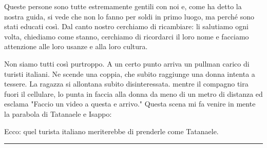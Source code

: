 Queste persone sono tutte estremamente gentili con noi e, come ha detto la nostra guida, si vede che non lo fanno per soldi in primo luogo, ma perché sono stati educati così. Dal canto nostro cerchiamo di ricambiare: li salutiamo ogni volta, chiediamo come stanno, cerchiamo di ricordarci il loro nome e facciamo attenzione alle loro usanze e alla loro cultura.

Non siamo tutti così purtroppo. A un certo punto arriva un pullman carico di turisti italiani. Ne scende una coppia, che subito raggiunge una donna intenta a tessere. La ragazza si allontana subito disinteressata. mentre il compagno tira fuori il cellulare, lo punta in faccia alla donna da meno di un metro di distanza ed esclama "Faccio un video a questa e arrivo." Questa scena mi fa venire in mente la parabola di Tatanaele e Isappo:

\FloatBarrier
{}
\FloatBarrier















Ecco: quel turista italiano meriterebbe di prenderle come Tatanaele.

\begin{center}
    \noindent\rule{0.6\textwidth}{0.4pt}
\end{center}

